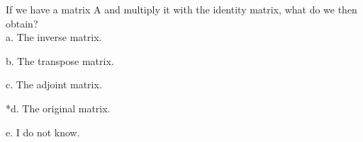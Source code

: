 
If we have a matrix A and multiply it with the identity matrix, what do we then obtain?\\

a. The inverse matrix.

b. The transpose matrix.

c. The adjoint matrix.

*d. The original matrix.

e. I do not know.\\
